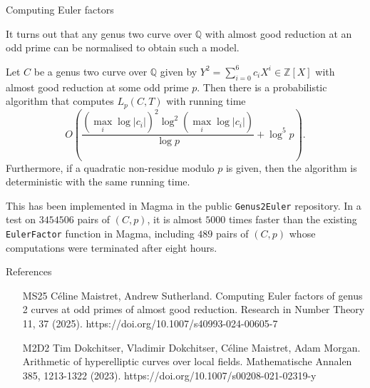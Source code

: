 \documentclass[10pt]{beamer}
\begin{document}
\begin{frame}[t]{Computing Euler factors}

It turns out that any genus two curve over $ \mathbb{Q} $ with almost good reduction at an odd prime can be normalised to obtain such a model.

\begin{theorem}[MS25, Theorem 1.1]
Let $ C $ be a genus two curve over $ \mathbb{Q} $ given by $ Y^2 = \sum_{i = 0}^6 c_iX^i \in \mathbb{Z}[X] $ with almost good reduction at some odd prime $ p $. Then there is a probabilistic algorithm that computes $ L_p(C, T) $ with running time
$$ O\left(\dfrac{(\max_i\log|c_i|)^2\log^2(\max_i\log|c_i|)}{\log p} + \log^5p\right). $$
Furthermore, if a quadratic non-residue modulo $ p $ is given, then the algorithm is deterministic with the same running time.
\end{theorem}

\vspace{0.5cm} This has been implemented in Magma in the public \texttt{Genus2Euler} repository. In a test on $ 3454506 $ pairs of $ (C, p) $, it is almost $ 5000 $ times faster than the existing \texttt{EulerFactor} function in Magma, including $ 489 $ pairs of $ (C, p) $ whose computations were terminated after eight hours.

\end{frame}

\begin{frame}{References}

\begin{itemize}
\item[MS25] C\'eline Maistret, Andrew Sutherland. Computing Euler factors of genus 2 curves at odd primes of almost good reduction. Research in Number Theory 11, 37 (2025). https://doi.org/10.1007/s40993-024-00605-7
\item[M2D2] Tim Dokchitser, Vladimir Dokchitser, C\'eline Maistret, Adam Morgan. Arithmetic of hyperelliptic curves over local fields. Mathematische Annalen 385, 1213-1322 (2023). https://doi.org/10.1007/s00208-021-02319-y
\end{itemize}

\end{frame}
\end{document}
